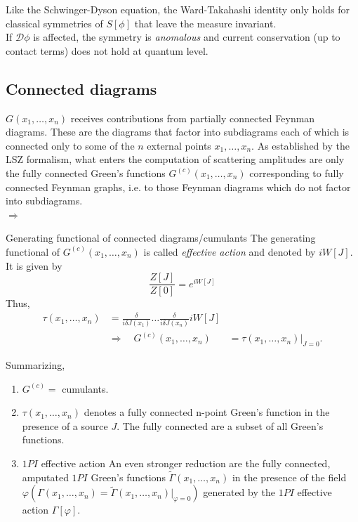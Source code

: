 Like the Schwinger-Dyson equation, the Ward-Takahashi identity only holds for classical symmetries of $S[\phi]$ that leave the measure invariant.\\
If $\mathcal{D}\phi$ is affected, the symmetry is \emph{anomalous} and current conservation (up to contact terms) does not hold at quantum level.


\subsection{Connected diagrams}
$G(x_1,\dots, x_n)$ receives contributions from partially connected Feynman diagrams. These are the diagrams that factor into subdiagrams each of which is connected only to some of the $n$ external points $x_1,\dots, x_n$. As established by the LSZ formalism, what enters the computation of scattering amplitudes are only the fully connected Green's functions $G^{(c)} (x_1, \dots, x_n)$ corresponding to fully connected Feynman graphs, i.e. to those Feynman diagrams which do not factor into subdiagrams. \\
$\Rightarrow$ 
\begin{mybox}{Generating functional of connected diagrams/cumulants}
	The generating functional of $G^{(c)}(x_1,\dots,x_n)$ is called \emph{effective action}  and denoted by $i W[J]$. It is given by 
	\begin{equation}
		\frac{Z[J]}{Z[0]} = e^{i W[J]}
	\end{equation}
	Thus,
	\begin{align}
		\tau(x_1,\dots,x_n) &= \frac{\delta}{i \delta J(x_1)} \dots \frac{\delta}{i \delta J(x_n)} i W[J] \\
		&\Rightarrow \quad G^{(c)}(x_1,\dots ,x_n) &= \tau (x_1, \dots,x_n) |_{J=0}.
	\end{align}
	\end{mybox}
Summarizing,
\begin{enumerate}
\item $G^{(c)}=$ cumulants.
\item  $\tau(x_1,\dots,x_n)$ denotes a fully connected n-point Green's function in the presence of a source $J$. The fully connected are a subset of all Green's functions.
\item \begin{mybox}{$1PI$ effective action}
	An even stronger reduction are the fully connected, amputated $1PI$ Green's functions $\tilde{\Gamma}(x_1, \dots,x_n)$ in the presence of the field $\varphi \left(\Gamma(x_1,\dots,x_n) = \tilde{\Gamma}(x_1,\dots,x_n)|_{\varphi=0}	\right)$ generated by the $1PI$ effective action $\Gamma[\varphi]$.
	\end{mybox}
\end{enumerate} 




